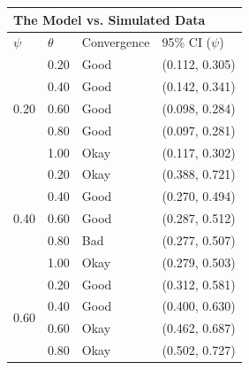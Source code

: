 \documentclass[12pt]{article}
\begin{document}
    \begin{center}
    \begin{tabular}{|l|l|l|l|}
        \hline
        \multicolumn{4}{|l|}{\textbf{The Model vs. Simulated Data}} \\
        \hline
            \(\psi\) & \(\theta\) & Convergence & 95\% CI (\(\psi\)) \\
        \hline
        \multirow{5}{*}{0.20}
            & \cellcolor{Green}0.20 & \cellcolor{Green}Good &
              \cellcolor{Green}(0.112, 0.305) \\
            & \cellcolor{Green}0.40 & \cellcolor{Green}Good &
              \cellcolor{Green}(0.142, 0.341) \\
            & \cellcolor{Green}0.60 & \cellcolor{Green}Good &
              \cellcolor{Green}(0.098, 0.284) \\
            & \cellcolor{Green}0.80 & \cellcolor{Green}Good &
              \cellcolor{Green}(0.097, 0.281) \\
            & \cellcolor{Yellow}1.00 & \cellcolor{Yellow}Okay &
              \cellcolor{Yellow}(0.117, 0.302) \\
        \hline
        \multirow{5}{*}{0.40}
            & \cellcolor{Yellow}0.20 & \cellcolor{Yellow}Okay &
              \cellcolor{Yellow}(0.388, 0.721) \\
            & \cellcolor{Green}0.40 & \cellcolor{Green}Good &
              \cellcolor{Green}(0.270, 0.494) \\
            & \cellcolor{Green}0.60 & \cellcolor{Green}Good &
              \cellcolor{Green}(0.287, 0.512) \\
            & \cellcolor{Red}0.80 & \cellcolor{Red}Bad &
              \cellcolor{Red}(0.277, 0.507) \\
            & \cellcolor{Yellow}1.00 & \cellcolor{Yellow}Okay &
              \cellcolor{Yellow}(0.279, 0.503) \\
        \hline
        \multirow{5}{*}{0.60}
            & \cellcolor{Yellow}0.20 & \cellcolor{Yellow}Good &
              \cellcolor{Yellow}(0.312, 0.581) \\
            & \cellcolor{Green}0.40 & \cellcolor{Green}Good &
              \cellcolor{Green}(0.400, 0.630) \\
            & \cellcolor{Yellow}0.60 & \cellcolor{Yellow}Okay &
              \cellcolor{Yellow}(0.462, 0.687) \\
            & \cellcolor{Yellow}0.80 & \cellcolor{Yellow}Okay &
              \cellcolor{Yellow}(0.502, 0.727) \\

\end{tabular}
\end{center}
\end{document}
